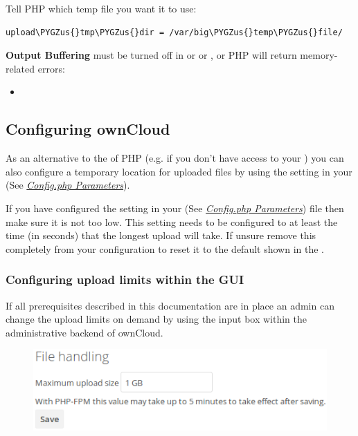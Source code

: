 \documentclass[letterpaper,10pt,english]{sphinxmanual}
\def\PYGZus{\char`\_}
\begin{document}
Tell PHP which temp file you want it to use:

\begin{Verbatim}[commandchars=\\\{\}]
upload\PYGZus{}tmp\PYGZus{}dir = /var/big\PYGZus{}temp\PYGZus{}file/
\end{Verbatim}

\textbf{Output Buffering} must be turned off in  or  or , or PHP
will return memory-related errors:
\begin{itemize}
\item {} 

\end{itemize}


\subsection{Configuring ownCloud}
\label{configuration_files/big_file_upload_configuration:configuring-owncloud}
As an alternative to the  of PHP (e.g. if you don't have access to your
) you can also configure a temporary location for uploaded files by using the
 setting in your  (See {\hyperref[configuration_server/config_sample_php_parameters::doc]{\emph{Config.php Parameters}}}).

If you have configured the  setting in your 
(See {\hyperref[configuration_server/config_sample_php_parameters::doc]{\emph{Config.php Parameters}}}) file then
make sure it is not too
low. This setting needs to be configured to at least the time (in seconds) that
the longest upload will take. If unsure remove this completely from your
configuration to reset it to the default shown in the .


\subsubsection{Configuring upload limits within the GUI}
\label{configuration_files/big_file_upload_configuration:configuring-upload-limits-within-the-gui}
If all prerequisites described in this documentation are in place an admin can change the
upload limits on demand by using the  input box within the administrative
backend of ownCloud.
\begin{figure}[htbp]
\centering

\includegraphics{admin_filehandling-1.png}
\end{figure}
\end{document}
